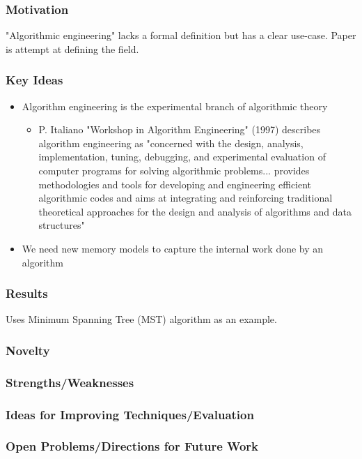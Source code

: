 \subsubsection{Motivation}

"Algorithmic engineering" lacks a formal definition but has a clear use-case. Paper is attempt at defining the field.

\subsubsection{Key Ideas}

\begin{itemize}
    \item Algorithm engineering is the experimental branch of algorithmic theory
    \begin{itemize}
        \item P. Italiano "Workshop in Algorithm Engineering" (1997) describes algorithm engineering as "concerned with the design, analysis, implementation, tuning, debugging, and experimental evaluation of computer programs for solving algorithmic problems... provides methodologies and tools for developing and engineering efficient algorithmic codes and aims at integrating and reinforcing traditional theoretical approaches for the design and analysis of algorithms and data structures"
    \end{itemize}
    \item We need new memory models to capture the internal work done by an algorithm
\end{itemize}

\subsubsection{Results}

Uses Minimum Spanning Tree (MST) algorithm as an example.

\subsubsection{Novelty}

\subsubsection{Strengths/Weaknesses}

\subsubsection{Ideas for Improving Techniques/Evaluation}

\subsubsection{Open Problems/Directions for Future Work}
